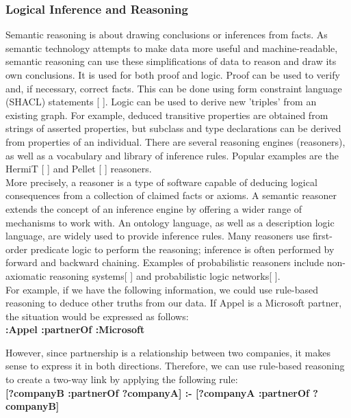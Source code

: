     \subsubsection{Logical Inference and Reasoning}
    Semantic reasoning is about drawing conclusions or inferences from facts. As semantic technology attempts to make data more useful and machine-readable, semantic reasoning can use these simplifications of data to reason and draw its own conclusions. It is used for both proof and logic. Proof can be used to verify and, if necessary, correct facts. This can be done using form constraint language (SHACL) statements [ ]. Logic can be used to derive new 'triples' from an existing graph. For example, deduced transitive properties are obtained from strings of asserted properties, but subclass and type declarations can be derived from properties of an individual. There are several reasoning engines (reasoners), as well as a vocabulary and library of inference rules. Popular examples are the HermiT [ ] and Pellet [ ] reasoners.\\

    More precisely, a reasoner is a type of software capable of deducing logical consequences from a collection of claimed facts or axioms. A semantic reasoner extends the concept of an inference engine by offering a wider range of mechanisms to work with. An ontology language, as well as a description logic language, are widely used to provide inference rules. Many reasoners use first-order predicate logic to perform the reasoning; inference is often performed by forward and backward chaining. Examples of probabilistic reasoners include non-axiomatic reasoning systems[ ] and probabilistic logic networks[ ].\\

    For example, if we have the following information, we could use rule-based reasoning to deduce other truths from our data. If Appel is a Microsoft partner, the situation would be expressed as follows:\\

    \textbf{:Appel :partnerOf :Microsoft}
    
    However, since partnership is a relationship between two companies, it makes sense to express it in both directions. Therefore, we can use rule-based reasoning to create a two-way link by applying the following rule:\\

    \textbf{[?companyB :partnerOf ?companyA] :- [?companyA :partnerOf ?companyB]}\\

